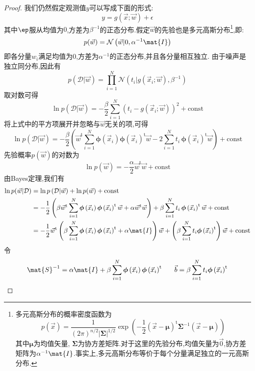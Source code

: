 \documentclass{ctexart}
\begin{document}
\begin{proof}
    我们仍然假定观测值$y$可以写成下面的形式:
    \[y=g(\vec{x};\vec{w})+\epsilon\]
    其中$\ep$服从均值为$0$,方差为$\beta^{-1}$的正态分布.假定$\vec{w}$的先验也是多元高斯分布\footnote{多元高斯分布的概率密度函数为
    \[p(\vec{x})=\dfrac{1}{(2\pi)^{n/2}|\boldsymbol{\Sigma}|^{1/2}}\exp\left(-\dfrac12(\vec{x}-\boldsymbol{\mu})^{\mathrm{t}}\boldsymbol{\Sigma}^{-1}(\vec{x}-\boldsymbol{\mu})\right)\]其中$\boldsymbol{\mu}$为均值矢量, $\boldsymbol{\Sigma}$为协方差矩阵.对于这里的先验分布,均值矢量为$\vec{0}$,协方差矩阵为$\alpha^{-1}\mat{I}$.事实上,多元高斯分布等价于每个分量满足独立的一元高斯分布.},即:
    \[p(\vec{w})=\mathcal{N}\left(\vec{w}|0,\alpha^{-1}\mat{I}\right)\]
    即各分量$w_i$满足均值为$0$,方差为$\alpha^{-1}$的正态分布,并且各分量相互独立.
    由于噪声是独立同分布,因此有
    \[p\left(\mathcal{D}|\vec{w}\right)=\prod_{i=1}^{N}\mathcal{N}\left(t_i|g\left(\vec{x}_i;\vec{w}\right),\beta^{-1}\right)\]
    取对数可得
    \[\ln p\left(\mathcal{D}|\vec{w}\right)=-\dfrac{\beta}{2}\sum_{i=1}^{N}\left(t_i-g\left(\vec{x}_i;\vec{w}\right)\right)^2+\text{const}\]
    将上式中的平方项展开并忽略与$\vec{w}$无关的项,可得
    \[\ln p\left(\mathcal{D}|\vec{w}\right)=-\dfrac{\beta}{2}\left(\vec{w}^{\mathrm{t}}\sum_{i=1}^{N}\boldsymbol{\phi}\left(\vec{x}_i\right)\boldsymbol{\phi}\left(\vec{x}_i\right)^{\mathrm{t}}\vec{w}-2\sum_{i=1}^{N}t_i\,\boldsymbol{\phi}\left(\vec{x}_i\right)^{\mathrm{t}}\vec{w}\right)+\text{const}\]
    先验概率$p(\vec{w})$的对数为
    \[\ln p(\vec{w})=-\dfrac{\alpha}{2}\vec{w}^{\mathrm{t}}\vec{w}+\text{const}\]
    由Bayes定理,我们有
    \[\begin{aligned}
        \ln p(\vec{w}|\mathcal{D})
        &= \ln p\left(\mathcal{D}|\vec{w}\right)+\ln p(\vec{w})+\text{const} \\
        &= -\dfrac12\left(\beta\vec{w}^\text{t}\sum_{i=1}^{N}\boldsymbol{\phi}\left(\vec{x}_i\right)\boldsymbol{\phi}\left(\vec{x}_i\right)^{\mathrm{t}}\vec{w}+\alpha\vec{w}^{\text{t}}\vec{w}\right)+\beta\sum_{i=1}^{N}t_i\,\boldsymbol{\phi}\left(\vec{x}_i\right)^{\mathrm{t}}\vec{w}+\text{const} \\
        &= -\dfrac{1}{2}\vec{w}^\text{t}\left(\beta\sum_{i=1}^{N}\boldsymbol{\phi}\left(\vec{x}_i\right)\boldsymbol{\phi}\left(\vec{x}_i\right)^{\mathrm{t}}+\alpha\mat{I}\right)\vec{w}+\left(\beta\sum_{i=1}^{N}t_i\boldsymbol{\phi}\left(\vec{x}_i\right)^{\mathrm{t}}\right)\vec{w}+\text{const}
    \end{aligned}\]
    令
    \[\mat{S}^{-1}=\alpha\mat{I}+\beta\sum_{i=1}^{N}\boldsymbol{\phi}\left(\vec{x}_i\right)\boldsymbol{\phi}\left(\vec{x}_i\right)^{\mathrm{t}}\ \ \ \ \ \vec{b}=\beta\sum_{i=1}^{N}t_i\boldsymbol{\phi}\left(\vec{x}_i\right)^{\mathrm{t}}\]

\end{proof}
\end{document}
